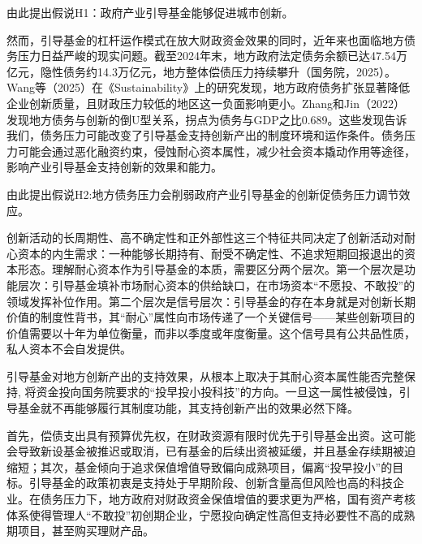 \documentclass[UTF8,a4paper,zihao=5,fontset=fandol]{ctexart}
\begin{document}
由此提出假说H1：政府产业引导基金能够促进城市创新。

然而，引导基金的杠杆运作模式在放大财政资金效果的同时，近年来也面临地方债务压力日益严峻的现实问题。截至2024年末，地方政府法定债务余额已达47.54万亿元，隐性债务约14.3万亿元，地方整体偿债压力持续攀升（国务院，2025）。Wang等（2025）在《Sustainability》上的研究发现，地方政府债务扩张显著降低企业创新质量，且财政压力较低的地区这一负面影响更小。Zhang和Jin（2022）发现地方债务与创新的倒U型关系，拐点为债务与GDP之比0.689。这些发现告诉我们，债务压力可能改变了引导基金支持创新产出的制度环境和运作条件。债务压力可能会通过恶化融资约束，侵蚀耐心资本属性，减少社会资本撬动作用等途径，影响产业引导基金支持创新的效果和能力。

由此提出假说H2:地方债务压力会削弱政府产业引导基金的创新促债务压力调节效应。

创新活动的长周期性、高不确定性和正外部性这三个特征共同决定了创新活动对耐心资本的内生需求：一种能够长期持有、耐受不确定性、不追求短期回报退出的资本形态。理解耐心资本作为引导基金的本质，需要区分两个层次。第一个层次是功能层次：引导基金填补市场耐心资本的供给缺口，在市场资本“不愿投、不敢投”的领域发挥补位作用。第二个层次是信号层次：引导基金的存在本身就是对创新长期价值的制度性背书，其“耐心”属性向市场传递了一个关键信号——某些创新项目的价值需要以十年为单位衡量，而非以季度或年度衡量。这个信号具有公共品性质，私人资本不会自发提供。

引导基金对地方创新产出的支持效果，从根本上取决于其耐心资本属性能否完整保持, 将资金投向国务院要求的“投早投小投科技”的方向。一旦这一属性被侵蚀，引导基金就不再能够履行其制度功能，其支持创新产出的效果必然下降。

首先，偿债支出具有预算优先权，在财政资源有限时优先于引导基金出资。这可能会导致新设基金被推迟或取消，已有基金的后续出资被延缓，并且基金存续期被迫缩短；其次，基金倾向于追求保值增值导致偏向成熟项目，偏离“投早投小”的目标。引导基金的政策初衷是支持处于早期阶段、创新含量高但风险也高的科技企业。在债务压力下，地方政府对财政资金保值增值的要求更为严格，国有资产考核体系使得管理人“不敢投”初创期企业，宁愿投向确定性高但支持必要性不高的成熟期项目，甚至购买理财产品。
\end{document}
